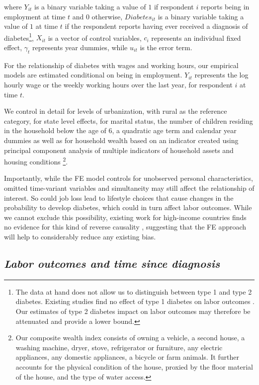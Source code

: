 \documentclass[12pt,english]{article}
\begin{document}
where $Y_{it}$ is a binary variable taking a value of $1$ if respondent $i$ reports being in employment at time $t$ and $0$ otherwise, $Diabetes_{it}$ is a binary variable taking a value of $1$ at time $t$ if the respondent reports having ever received a diagnosis of diabetes\footnote{The data at hand does not allow us to distinguish between type 1 and type 2 diabetes. Existing studies find no effect of type 1 diabetes on labor outcomes  \parencite{Minor2011,Minor2015}. Our estimates of type 2 diabetes impact on labor outcomes may therefore be attenuated and provide a lower bound.}, $X_{it}$ is a vector of control variables, $c_{i}$ represents an individual fixed effect, $\gamma_{t}$ represents year dummies, while $u_{it}$ is the error term.

For the relationship of diabetes with wages and working hours, our empirical models are estimated conditional on being in employment. $Y_{it}$ represents the log hourly wage or the weekly working hours over the last year, for respondent $i$ at time $t$.

We control in detail for levels of urbanization, with rural as the reference category, for state level effects, for marital status, the number of children residing in the household below the age of 6, a quadratic age term and calendar year dummies as well as for household wealth based on an indicator created using principal component analysis of multiple indicators of household assets and housing conditions \parencite{Filmer2001}\footnote{Our composite wealth index consists of owning a vehicle, a second house, a washing machine, dryer, stove, refrigerator or furniture, any electric appliances, any domestic appliances, a bicycle or farm animals. It further accounts for the physical condition of the house, proxied by the floor material of the house, and the type of water access.}. 

Importantly, while the \ac{FE} model controls for unobserved personal characteristics, omitted time-variant variables and simultaneity may still affect the relationship of interest. So could job loss lead to lifestyle choices that cause changes in the probability to develop diabetes, which could in turn affect labor outcomes. While we cannot exclude this possibility, existing work for high-income countries finds no evidence for this kind of reverse causality \parencite{Bergemann2011,Schaller2015}, suggesting that the \ac{FE} approach will help to considerably reduce any existing bias.


\subsection{\textit{Labor outcomes and time since diagnosis}}
\end{document}
